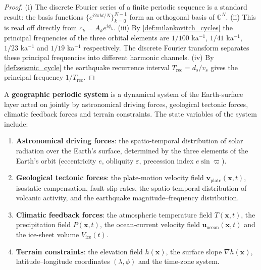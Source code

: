 \begin{proof}
(i) The discrete Fourier series of a finite periodic sequence is a standard result: the basis functions $\{e^{i2\pi kt/N}\}_{k=0}^{N-1}$ form an orthogonal basis of $\mathbb C^N$.
(ii) This is read off directly from $c_k=A_k e^{i\phi_k}$.
(iii) By \cref{def:milankovitch_cycles} the principal frequencies of the three orbital elements are $1/100$ ka$^{-1}$, $1/41$ ka$^{-1}$, $1/23$ ka$^{-1}$ and $1/19$ ka$^{-1}$ respectively. The discrete Fourier transform separates these principal frequencies into different harmonic channels.
(iv) By \cref{def:seismic_cycle} the earthquake recurrence interval $T_{\text{rec}}=d_s/v_s$ gives the principal frequency $1/T_{\text{rec}}$.
\end{proof}

\begin{definition}\label{def:geographic_periodic_system}
A \textbf{geographic periodic system} is a dynamical system of the Earth-surface layer acted on jointly by astronomical driving forces, geological tectonic forces, climatic feedback forces and terrain constraints. The state variables of the system include:
\begin{enumerate}[label=(\roman*)]
    \item \textbf{Astronomical driving forces}: the spatio-temporal distribution of solar radiation over the Earth's surface, determined by the three elements of the Earth's orbit (eccentricity $e$, obliquity $\varepsilon$, precession index $e\sin\varpi$).
    \item \textbf{Geological tectonic forces}: the plate-motion velocity field $\mathbf{v}_{\text{plate}}(\mathbf{x}, t)$, isostatic compensation, fault slip rates, the spatio-temporal distribution of volcanic activity, and the earthquake magnitude--frequency distribution.
    \item \textbf{Climatic feedback forces}: the atmospheric temperature field $T(\mathbf{x}, t)$, the precipitation field $P(\mathbf{x}, t)$, the ocean-current velocity field $\mathbf{u}_{\text{ocean}}(\mathbf{x}, t)$ and the ice-sheet volume $V_{\text{ice}}(t)$.
    \item \textbf{Terrain constraints}: the elevation field $h(\mathbf{x})$, the surface slope $\nabla h(\mathbf{x})$, latitude--longitude coordinates $(\lambda, \phi)$ and the time-zone system.
\end{enumerate}
\end{definition}

